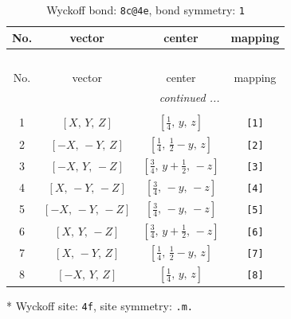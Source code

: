 \documentclass[fleqn,8pt]{jsarticle}
\begin{document}
\renewcommand{\arraystretch}{1.2}
\begin{longtable}{cccc}
\caption{Wyckoff bond: {\tt 8c@4e}, bond symmetry: {\tt 1}}
 \\
 \hline \hline
No. & vector & center & mapping \\ \hline \endfirsthead

\multicolumn{3}{l}{\tablename\ \thetable{}} \\
 \hline \hline
No. & vector & center & mapping \\ \hline \endhead

 \hline \hline
\multicolumn{3}{r}{\footnotesize\it continued ...} \\ \endfoot

 \hline \hline
\multicolumn{3}{r}{} \\ \endlastfoot

1 & $\left[ X,\, Y,\, Z \right]$ & $\left[ \frac{1}{4},\, y,\, z \right]$ & {\tt [1]} \\ \hline
2 & $\left[ - X,\, - Y,\, Z \right]$ & $\left[ \frac{1}{4},\, \frac{1}{2} - y,\, z \right]$ & {\tt [2]} \\ \hline
3 & $\left[ - X,\, Y,\, - Z \right]$ & $\left[ \frac{3}{4},\, y + \frac{1}{2},\, - z \right]$ & {\tt [3]} \\ \hline
4 & $\left[ X,\, - Y,\, - Z \right]$ & $\left[ \frac{3}{4},\, - y,\, - z \right]$ & {\tt [4]} \\ \hline
5 & $\left[ - X,\, - Y,\, - Z \right]$ & $\left[ \frac{3}{4},\, - y,\, - z \right]$ & {\tt [5]} \\ \hline
6 & $\left[ X,\, Y,\, - Z \right]$ & $\left[ \frac{3}{4},\, y + \frac{1}{2},\, - z \right]$ & {\tt [6]} \\ \hline
7 & $\left[ X,\, - Y,\, Z \right]$ & $\left[ \frac{1}{4},\, \frac{1}{2} - y,\, z \right]$ & {\tt [7]} \\ \hline
8 & $\left[ - X,\, Y,\, Z \right]$ & $\left[ \frac{1}{4},\, y,\, z \right]$ & {\tt [8]} \\
\end{longtable}
* Wyckoff site: {\tt 4f}, site symmetry: {\tt .m.}
\renewcommand{\arraystretch}{1.2}
\end{document}
